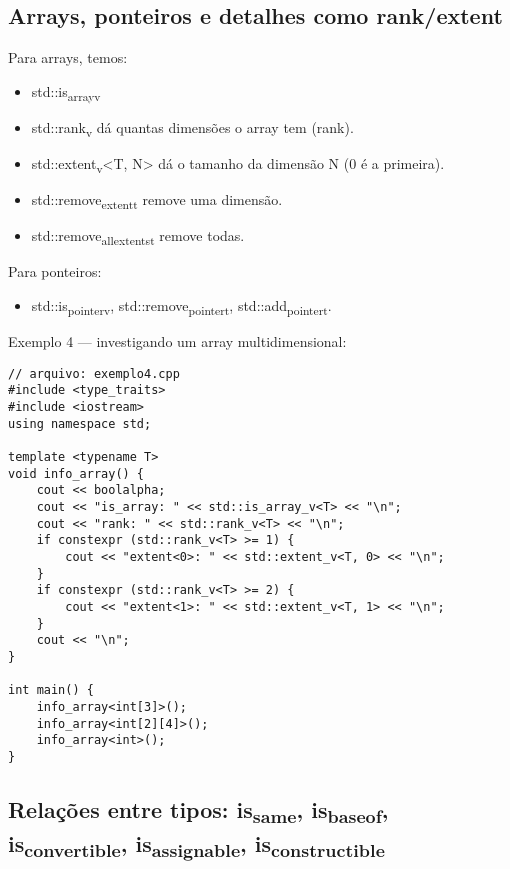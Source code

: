 \documentclass[11pt]{article}
\begin{document}
\subsection{Arrays, ponteiros e detalhes como rank/extent}
\label{sec:orgd62e14d}

Para arrays, temos:
\begin{itemize}
\item std::is\textsubscript{array}\textsubscript{v}
\item std::rank\textsubscript{v} dá quantas dimensões o array tem (rank).
\item std::extent\textsubscript{v}<T, N> dá o tamanho da dimensão N (0 é a primeira).
\item std::remove\textsubscript{extent}\textsubscript{t} remove uma dimensão.
\item std::remove\textsubscript{all}\textsubscript{extents}\textsubscript{t} remove todas.
\end{itemize}

Para ponteiros:
\begin{itemize}
\item std::is\textsubscript{pointer}\textsubscript{v}, std::remove\textsubscript{pointer}\textsubscript{t}, std::add\textsubscript{pointer}\textsubscript{t}.
\end{itemize}

Exemplo 4 — investigando um array multidimensional:
\begin{verbatim}
// arquivo: exemplo4.cpp
#include <type_traits>
#include <iostream>
using namespace std;

template <typename T>
void info_array() {
    cout << boolalpha;
    cout << "is_array: " << std::is_array_v<T> << "\n";
    cout << "rank: " << std::rank_v<T> << "\n";
    if constexpr (std::rank_v<T> >= 1) {
        cout << "extent<0>: " << std::extent_v<T, 0> << "\n";
    }
    if constexpr (std::rank_v<T> >= 2) {
        cout << "extent<1>: " << std::extent_v<T, 1> << "\n";
    }
    cout << "\n";
}

int main() {
    info_array<int[3]>();
    info_array<int[2][4]>();
    info_array<int>();
}
\end{verbatim}
\subsection{Relações entre tipos: is\textsubscript{same}, is\textsubscript{base}\textsubscript{of}, is\textsubscript{convertible}, is\textsubscript{assignable}, is\textsubscript{constructible}}
\label{sec:orgaeef8ee}
\end{document}
